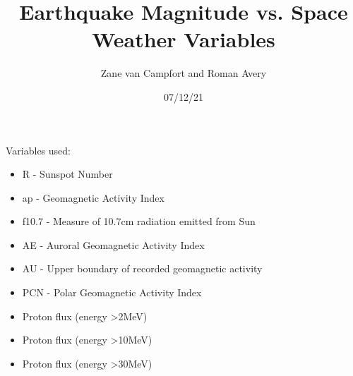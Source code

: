 \documentclass[12pt]{article}
\title{Earthquake Magnitude vs. Space Weather Variables}
\author{Zane van Campfort and Roman Avery}
\date{07/12/21}
\begin{document}
\maketitle
\begin{large}
Variables used:

\begin{itemize}
  \item R - Sunspot Number
  \item ap - Geomagnetic Activity Index
  \item f10.7 - Measure of 10.7cm radiation emitted from Sun
  \item AE - Auroral Geomagnetic Activity Index
  \item AU - Upper boundary of recorded geomagnetic activity
  \item PCN - Polar Geomagnetic Activity Index
  \item Proton flux (energy \textgreater  2MeV)
  \item Proton flux (energy \textgreater  10MeV)
  \item Proton flux (energy \textgreater  30MeV)
\end{itemize}
\end{large}

\graphicspath{{../plots/07_12/}}


\newpage
\end{document}
